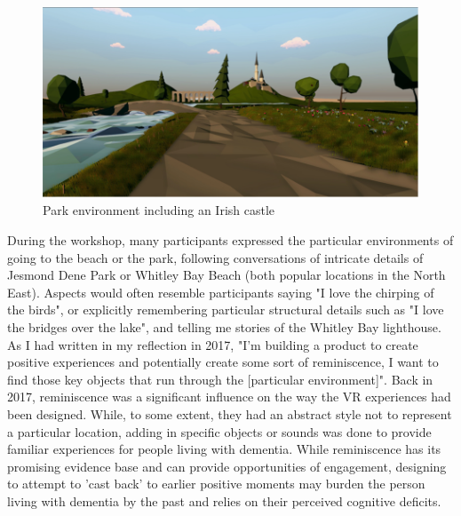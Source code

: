 \begin{figure}
\centering
\includegraphics[width=.8\linewidth]{Images/ChapterFour/IrishCastlVR.png}
\caption{Park environment including an Irish castle}
\label{fig:IrishCastle}
\end{figure}

During the workshop, many participants expressed the particular environments of going to the beach or the park, following conversations of intricate details of Jesmond Dene Park or Whitley Bay Beach (both popular locations in the North East). Aspects would often resemble participants saying "I love the chirping of the birds", or explicitly remembering particular structural details such as "I love the bridges over the lake", and telling me stories of the Whitley Bay lighthouse. As I had written in my reflection in 2017, "I'm building a product to create positive experiences and potentially create some sort of reminiscence, I want to find those key objects that run through the [particular environment]". Back in 2017, reminiscence was a significant influence on the way the VR experiences had been designed. While, to some extent, they had an abstract style not to represent a particular location, adding in specific objects or sounds was done to provide familiar experiences for people living with dementia. While reminiscence has its promising evidence base and can provide opportunities of engagement, designing to attempt to 'cast back' to earlier positive moments may burden the person living with dementia by the past and relies on their perceived cognitive deficits. 

